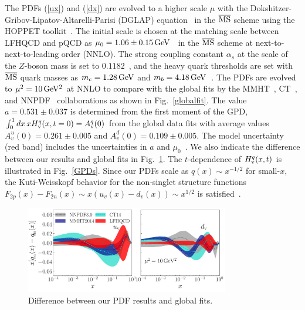 \documentclass[aps,prl,reprint,groupedaddress, preprintnumbers]{revtex4-1}
\newcommand{\req}[1]{(\ref{#1})}
\begin{document}
The PDFs \req{ux} and \req{dx} are evolved to a higher scale $\mu$ with the Dokshitzer-Gribov-Lipatov-Altarelli-Parisi (DGLAP) equation~\cite{Altarelli:1977zs,Dokshitzer:1977sg,Gribov:1972ri} in the $\overline{\rm MS}$ scheme using the HOPPET toolkit~\cite{Salam:2008qg}. The initial scale is chosen at the matching scale between LFHQCD and pQCD as $\mu_0 = 1.06 \pm 0.15 \,\rm GeV$~\cite{Deur:2016opc} in the $\overline{\rm MS}$ scheme at next-to-next-to-leading order (NNLO). The strong coupling constant $\alpha_s$ at the scale of the $Z$-boson mass is set to $0.1182$~\cite{Patrignani:2016xqp}, and the heavy quark thresholds are set with $\overline{\rm MS}$ quark  masses as $m_c=1.28\,\rm GeV$ and $m_b=4.18\,\rm GeV$~\cite{Patrignani:2016xqp}. The PDFs are evolved to $\mu^2=10\,\rm GeV^2$ at NNLO to compare with the global fits by the  MMHT~\cite{Harland-Lang:2014zoa}, CT~\cite{Dulat:2015mca}, and NNPDF~\cite{Ball:2014uwa}  collaborations as shown in Fig.~\ref{globalfit}.  The value  $a = 0.531 \pm 0.037$ is determined from the first moment of the GPD,
$
\int_0^1 dx \,x  H^q_{\rm v}(x, t = 0) = A^q_{\rm v}(0)
$
from  the global data fits with average values $A_v^u(0) = 0.261 \pm 0.005$ and 
$A_v^d(0) = 0.109 \pm 0.005$. The model uncertainty (red band) includes the uncertainties in $a$ and $\mu_0$~\cite{mu0}.  We also indicate the  difference between our results and global fits in Fig.~\ref{globalfitdiff}. 
The $t$-dependence of $H^q_{\rm v}(x,t)$ is illustrated in Fig.~\ref{GPDs}.  Since our PDFs scale as $q(x) \sim x^{-1/2}$ for small-$x$, the Kuti-Weisskopf behavior for the non-singlet structure functions $F_{2p} (x) - F_{2n}(x) \sim x (u_v(x) - d_v(x)) \sim x^{1/2}$ is satisfied~\cite{Kuti:1971ph, Landshoff:1970ff}.


\begin{figure}[!h]
\centering
\includegraphics[width=8.9cm]{proton-diff-xq.pdf}
\caption{\label{globalfitdiff}  Difference between our PDF results and global fits.}
\end{figure}
 
\end{document}
